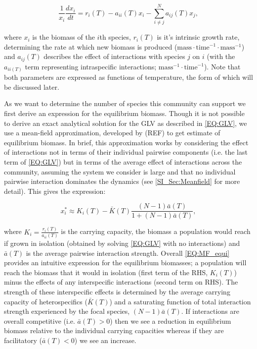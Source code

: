 \documentclass{article}
\begin{document}
\begin{equation} \label{EQ:GLV}
  \frac{1}{x_i} \frac{dx_i}{dt} = r_i(T) - a_{ii}(T) x_i - \sum^N_{i \neq j} a_{ij}(T) x_j, 
\end{equation}

where $x_i$ is the biomass of the $i$th species, $r_i(T)$ is it's intrinsic growth rate, determining the rate at which new biomass is produced ($\text{mass} \cdot \text{time}^{-1} \cdot \text{mass}^{-1} $) and $a_{ij}(T)$ describes the effect of interactions with species $j$ on $i$ (with the $a_{ii(T)}$ term representing intraspecific interactions; $\text{mass}^{-1} \cdot \text{time}^{-1}$). Note that both parameters are expressed as functions of temperature, the form of which will be discussed later.  

As we want to determine the number of species this community can support we first derive an expression for the equilibrium biomass. Though it is not possible to derive an exact analytical solution for the GLV as described in \cref{EQ:GLV}, we use a mean-field approximation, developed by (REF) to get estimate of equilibrium biomass. In brief, this approximation works by considering the effect of interactions not in terms of their individual pairwise components (i.e. the last term of \cref{EQ:GLV}) but in terms of the average effect of interactions across the community, assuming the system we consider is large and that no individual pairwise interaction dominates the dynamics (see \cref{SI_Sec:Meanfield} for more detail). This gives the expression: 

\begin{equation}\label{EQ:MF_equi}
  x^*_i \approx K_i(T) -  \bar{K}(T)  \frac{ (N-1)\bar{a}(T)}{1 + (N-1)\bar{a}(T)}, 
\end{equation}

where $K_i = \frac{r_i(T)}{a_{ii}(T)}$ is the carrying capacity, the biomass a population would reach if grown in isolation (obtained by solving \cref{EQ:GLV} with no interactions) and $\bar{a}(T)$ is the average pairwise interaction strength. Overall \cref{EQ:MF_equi} provides an intuitive expression for the equilibrium biomasses; a population will reach the biomass that it would in isolation (first term of the RHS, $K_i(T)$) minus the effects of any interspecific interactions (second term on RHS). The strength of these interspecific effects is determined by the average carrying capacity of heterospecifics ($\bar{K}(T)$) and a saturating function of total interaction strength experienced by the focal species, $(N-1)\bar{a}(T)$. If interactions are overall competitive (i.e. $ \bar{a}(T) > 0$) then we see a reduction in equilibrium biomass relative to the individual carrying capacities whereas if they are facilitatory ($ \bar{a}(T) < 0$) we see an increase.  
\end{document}
